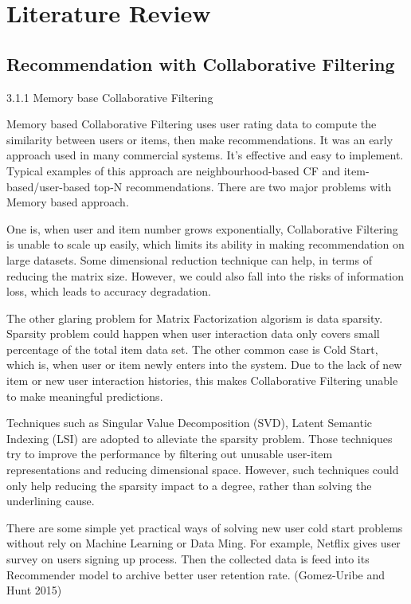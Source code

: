 \section{Literature Review}

\subsection{Recommendation with Collaborative Filtering }
3.1.1 Memory base Collaborative Filtering 

Memory based Collaborative Filtering uses user rating data to compute the similarity between users or items, then make recommendations. It was an early approach used in many commercial systems. It's effective and easy to implement. Typical examples of this approach are neighbourhood-based CF and item-based/user-based top-N recommendations. There are two major problems with Memory based approach.  

One is, when user and item number grows exponentially, Collaborative Filtering is unable to scale up easily, which limits its ability in making recommendation on large datasets. Some dimensional reduction technique can help, in terms of reducing the matrix size. However, we could also fall into the risks of information loss, which leads to accuracy degradation.  

The other glaring problem for Matrix Factorization algorism is data sparsity. Sparsity problem could happen when user interaction data only covers small percentage of the total item data set. The other common case is Cold Start, which is, when user or item newly enters into the system. Due to the lack of new item or new user interaction histories, this makes Collaborative Filtering unable to make meaningful predictions.  

Techniques such as Singular Value Decomposition (SVD), Latent Semantic Indexing (LSI) are adopted to alleviate the sparsity problem. Those techniques try to improve the performance by filtering out unusable user-item representations and reducing dimensional space. However, such techniques could only help reducing the sparsity impact to a degree, rather than solving the underlining cause. 

There are some simple yet practical ways of solving new user cold start problems without rely on Machine Learning or Data Ming. For example, Netflix gives user survey on users signing up process. Then the collected data is feed into its Recommender model to archive better user retention rate. (Gomez-Uribe and Hunt 2015) 

